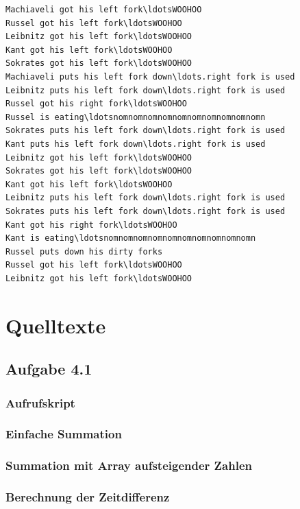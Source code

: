 \documentclass[a4paper,
12pt,
BCOR12mm,
]{scrartcl}
\begin{document}
\begin{verbatim}
Machiaveli got his left fork\ldotsWOOHOO
Russel got his left fork\ldotsWOOHOO
Leibnitz got his left fork\ldotsWOOHOO
Kant got his left fork\ldotsWOOHOO
Sokrates got his left fork\ldotsWOOHOO
Machiaveli puts his left fork down\ldots.right fork is used
Leibnitz puts his left fork down\ldots.right fork is used
Russel got his right fork\ldotsWOOHOO
Russel is eating\ldotsnomnomnomnomnomnomnomnomnomnomn
Sokrates puts his left fork down\ldots.right fork is used
Kant puts his left fork down\ldots.right fork is used
Leibnitz got his left fork\ldotsWOOHOO
Sokrates got his left fork\ldotsWOOHOO
Kant got his left fork\ldotsWOOHOO
Leibnitz puts his left fork down\ldots.right fork is used
Sokrates puts his left fork down\ldots.right fork is used
Kant got his right fork\ldotsWOOHOO
Kant is eating\ldotsnomnomnomnomnomnomnomnomnomnomn
Russel puts down his dirty forks
Russel got his left fork\ldotsWOOHOO
Leibnitz got his left fork\ldotsWOOHOO
\end{verbatim}
\section{Quelltexte}
\subsection{Aufgabe 4.1}
\subsubsection{Aufrufskript}
\label{src:call}

 
\subsubsection{Einfache Summation}
\label{src:sum}

\subsubsection{Summation mit Array aufsteigender Zahlen}
\label{src:ascend}


\subsubsection{Berechnung der Zeitdifferenz}
\label{src:messure}


\end{document}

